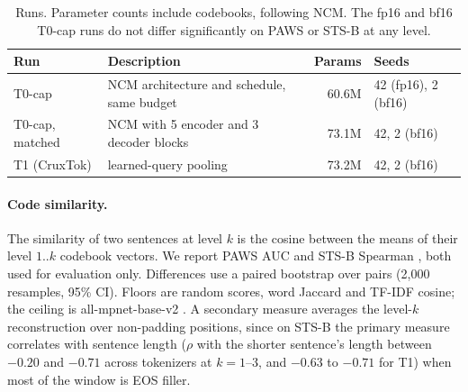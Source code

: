 \documentclass[11pt]{article}
\begin{document}
\begin{table}[t]
\centering
\footnotesize
\begin{tabular}{llrl}
\toprule
Run & Description & Params & Seeds \\
\midrule
T0-cap & NCM architecture and schedule, same budget & 60.6M & 42 (fp16), 2 (bf16) \\
T0-cap, matched & NCM with 5 encoder and 3 decoder blocks & 73.1M & 42, 2 (bf16) \\
T1 (CruxTok) & learned-query pooling & 73.2M & 42, 2 (bf16) \\
\bottomrule
\end{tabular}
\caption{Runs. Parameter counts include codebooks, following NCM. The fp16 and bf16 T0-cap runs do not differ significantly on PAWS or STS-B at any level.}
\label{tab:runs}
\end{table}

\paragraph{Code similarity.} The similarity of two sentences at level $k$ is the cosine between the means of their level $1..k$ codebook vectors. We report PAWS AUC \citep[labeled\_final test, 8{,}000 pairs;][]{zhang2019paws} and STS-B Spearman \citep[test, 1{,}379 pairs;][]{cer2017stsb}, both used for evaluation only. Differences use a paired bootstrap over pairs (2{,}000 resamples, 95\% CI). Floors are random scores, word Jaccard and TF-IDF cosine; the ceiling is all-mpnet-base-v2 \citep{reimers2019sbert}. A secondary measure averages the level-$k$ reconstruction over non-padding positions, since on STS-B the primary measure correlates with sentence length ($\rho$ with the shorter sentence's length between $-0.20$ and $-0.71$ across tokenizers at $k{=}1$--3, and $-0.63$ to $-0.71$ for T1) when most of the window is EOS filler.
\end{document}
